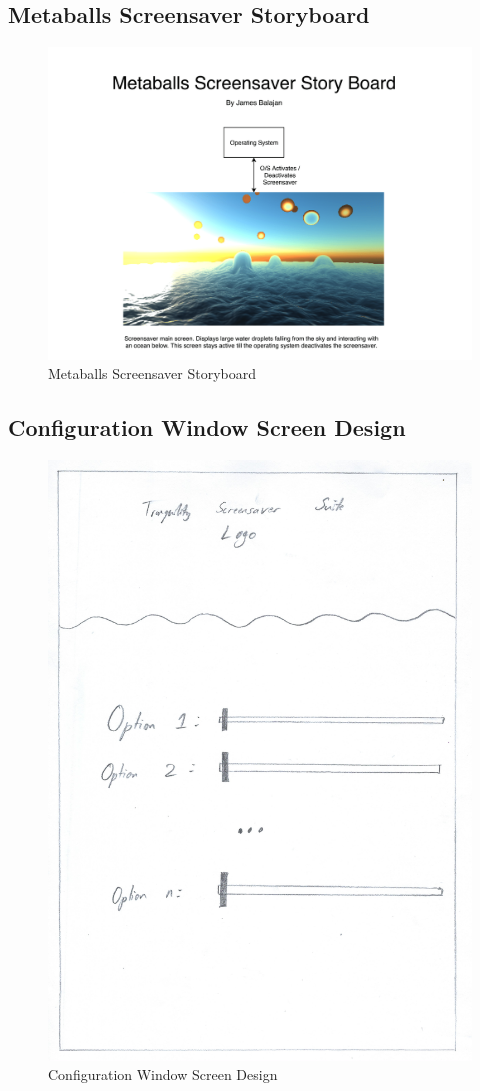 \documentclass[10pt, openany]{book}
\begin{document}
\subsection{Metaballs Screensaver Storyboard}
\begin{figure}[H]
	\centering
	\includegraphics[width=1.0\linewidth]{Metaballs Screensaver Story Board}
	\caption{Metaballs Screensaver Storyboard}
	\label{app:metaballs-story}
\end{figure}
\newpage

\subsection{Configuration Window Screen Design}
\begin{figure}[H]
	\centering
	\includegraphics[width=0.8\linewidth]{ConfigurationWindow}
	\caption{Configuration Window Screen Design}
	\label{app:config-screen}
\end{figure}
\newpage
\end{document}
